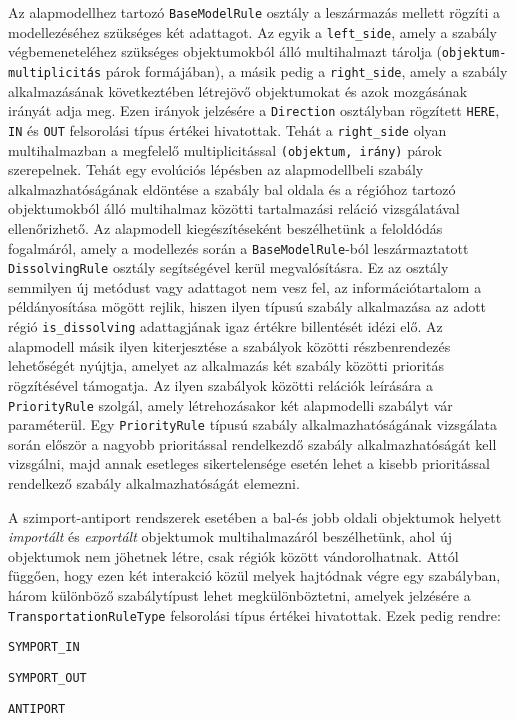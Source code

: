 Az alapmodellhez tartozó \verb|BaseModelRule| osztály a leszármazás mellett rögzíti a modellezéséhez szükséges két adattagot. Az egyik a \verb|left_side|, amely a szabály végbemeneteléhez szükséges objektumokból álló multihalmazt tárolja (\verb|objektum-multiplicitás| párok formájában), a másik pedig a \verb|right_side|, amely a szabály alkalmazásának következtében létrejövő objektumokat és azok mozgásának irányát adja meg. Ezen irányok jelzésére a \verb|Direction| osztályban rögzített \verb|HERE|, \verb|IN| és \verb|OUT| felsorolási típus értékei hivatottak. Tehát a \verb|right_side| olyan multihalmazban a megfelelő multiplicitással \verb|(objektum, irány)| párok szerepelnek.
Tehát egy evolúciós lépésben az alapmodellbeli szabály alkalmazhatóságának eldöntése a szabály bal oldala és a régióhoz tartozó objektumokból álló multihalmaz közötti tartalmazási reláció vizsgálatával ellenőrizhető. 
Az alapmodell kiegészítéseként beszélhetünk a feloldódás fogalmáról, amely a modellezés során a \verb|BaseModelRule|-ból leszármaztatott \verb|DissolvingRule| osztály segítségével kerül megvalósításra. Ez az osztály semmilyen új metódust vagy adattagot nem vesz fel, az információtartalom a példányosítása mögött rejlik, hiszen ilyen típusú szabály alkalmazása az adott régió \verb|is_dissolving| adattagjának igaz értékre billentését idézi elő. 
Az alapmodell másik ilyen kiterjesztése a szabályok közötti részbenrendezés lehetőségét nyújtja, amelyet az alkalmazás két szabály közötti prioritás rögzítésével támogatja. Az ilyen szabályok közötti relációk leírására a \verb|PriorityRule| szolgál, amely létrehozásakor két alapmodelli szabályt vár paraméterül.
Egy \verb|PriorityRule| típusú szabály alkalmazhatóságának vizsgálata során először a nagyobb prioritással rendelkezdő szabály alkalmazhatóságát kell vizsgálni, majd annak esetleges  sikertelensége esetén lehet a kisebb prioritással rendelkező szabály alkalmazhatóságát elemezni.

A szimport-antiport rendszerek esetében a bal-és jobb oldali objektumok helyett \textit{importált} és \textit{exportált} objektumok multihalmazáról beszélhetünk, ahol új objektumok nem jöhetnek létre, csak régiók között vándorolhatnak. Attól függően, hogy ezen két interakció közül melyek hajtódnak végre egy szabályban, három különböző szabálytípust lehet megkülönböztetni, amelyek jelzésére a \verb|TransportationRuleType| felsorolási típus értékei hivatottak. Ezek pedig rendre:
\begin{compactenum}
\item \verb|SYMPORT_IN|
\item \verb|SYMPORT_OUT|
\item \verb|ANTIPORT|
\end{compactenum}

